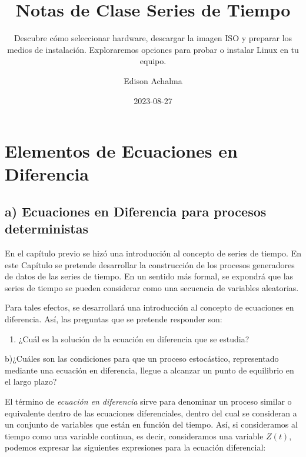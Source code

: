 \documentclass[
  a4paper,
]{article}
\title{Notas de Clase Series de Tiempo}
\subtitle{Descubre cómo seleccionar hardware, descargar la imagen ISO y
preparar los medios de instalación. Exploraremos opciones para probar o
instalar Linux en tu equipo.}
\author{Edison Achalma}
\date{2023-08-27}
\providecommand{\tightlist}{%
  \setlength{\itemsep}{0pt}\setlength{\parskip}{0pt}}\usepackage{longtable,booktabs,array}
\begin{document}
\maketitle
\ifdefined\Shaded\renewenvironment{Shaded}{\begin{tcolorbox}[enhanced, frame hidden, borderline west={3pt}{0pt}{shadecolor}, breakable, interior hidden, sharp corners, boxrule=0pt]}{\end{tcolorbox}}\fi

\hypertarget{elementos-de-ecuaciones-en-diferencia}{%
\section{Elementos de Ecuaciones en
Diferencia}\label{elementos-de-ecuaciones-en-diferencia}}

\hypertarget{a-ecuaciones-en-diferencia-para-procesos-deterministas}{%
\subsection{a) Ecuaciones en Diferencia para procesos
deterministas}\label{a-ecuaciones-en-diferencia-para-procesos-deterministas}}

En el capítulo previo se hizó una introducción al concepto de series de
tiempo. En este Capítulo se pretende desarrollar la construcción de los
procesos generadores de datos de las series de tiempo. En un sentido más
formal, se expondrá que las series de tiempo se pueden considerar como
una secuencia de variables aleatorias.

Para tales efectos, se desarrollará una introducción al concepto de
ecuaciones en diferencia. Así, las preguntas que se pretende responder
son:

\begin{enumerate}
\def\labelenumi{\alph{enumi})}
\tightlist
\item
  ¿Cuál es la solución de la ecuación en diferencia que se estudia?
\end{enumerate}

b)¿Cuáles son las condiciones para que un proceso estocástico,
representado mediante una ecuación en diferencia, llegue a alcanzar un
punto de equilibrio en el largo plazo?

El término de \emph{ecuación en diferencia} sirve para denominar un
proceso similar o equivalente dentro de las ecuaciones diferenciales,
dentro del cual se consideran a un conjunto de variables que están en
función del tiempo. Así, si consideramos al tiempo como una variable
continua, es decir, consideramos una variable \(Z(t)\), podemos expresar
las siguientes expresiones para la ecuación diferencial:
\end{document}
